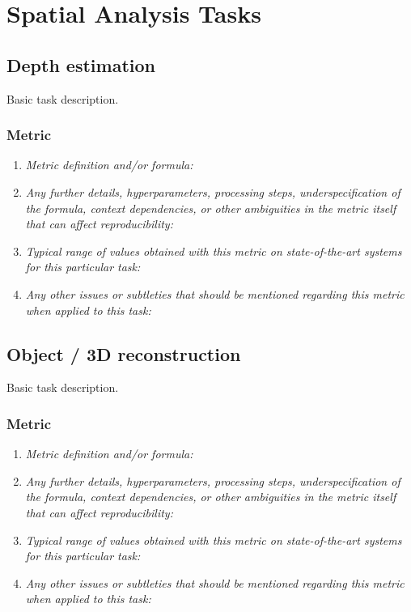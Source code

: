 \documentclass[a4paper,11pt]{article}
\begin{document}
\section{Spatial Analysis Tasks}
    \subsection{Depth estimation} \label{depth_estimation}
        Basic task description.
        \subsubsection{Metric}
            \begin{enumerate}[label=\alph*.]
                \item \textit{Metric definition and/or formula:}
                \bigskip
                \item \textit{Any further details, hyperparameters, processing steps, underspecification of the formula, context dependencies, or other ambiguities in the metric itself that can affect reproducibility:}
                \bigskip
                \item \textit{Typical range of values obtained with this metric on state-of-the-art systems for this particular task:}
                \bigskip
                \item \textit{Any other issues or subtleties that should be mentioned regarding this metric when applied to this task:}
                \bigskip
            \end{enumerate}

    \subsection{Object / 3D reconstruction} \label{object_3d_reconstruction}
        Basic task description.
        \subsubsection{Metric}
            \begin{enumerate}[label=\alph*.]
                \item \textit{Metric definition and/or formula:}
                \bigskip
                \item \textit{Any further details, hyperparameters, processing steps, underspecification of the formula, context dependencies, or other ambiguities in the metric itself that can affect reproducibility:}
                \bigskip
                \item \textit{Typical range of values obtained with this metric on state-of-the-art systems for this particular task:}
                \bigskip
                \item \textit{Any other issues or subtleties that should be mentioned regarding this metric when applied to this task:}
                \bigskip
            \end{enumerate}
\end{document}
